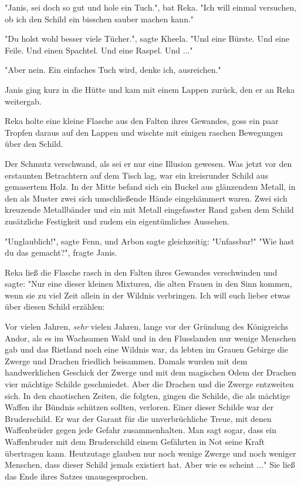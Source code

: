 \documentclass[10pt, a4paper, oneside]{book}
\begin{document}
\begin{multicols}{2}
"Janis, sei doch so gut und hole ein Tuch.", bat Reka. "Ich will einmal versuchen, ob ich den Schild ein bisschen sauber machen kann." 

"Du holst wohl besser viele Tücher.", sagte Kheela. "Und eine Bürste. Und eine Feile. Und einen Spachtel. Und eine Raspel. Und ..." 

"Aber nein. Ein einfaches Tuch wird, denke ich, ausreichen." 

Janis ging kurz in die Hütte und kam mit einem Lappen zurück, den er an Reka weitergab. 

Reka holte eine kleine Flasche aus den Falten ihres Gewandes, goss ein paar Tropfen daraus auf den Lappen und wischte mit einigen raschen Bewegungen über den Schild. 

Der Schmutz verschwand, als sei er nur eine Illusion gewesen. Was jetzt vor den erstaunten Betrachtern auf dem Tisch lag, war ein kreisrunder Schild aus gemasertem Holz. In der Mitte befand sich ein Buckel aus glänzendem Metall, in den als Muster zwei sich umschließende Hände eingehämmert waren. Zwei sich kreuzende Metallbänder und ein mit Metall eingefasster Rand gaben dem Schild zusätzliche Festigkeit und zudem ein eigentümliches Aussehen. 

"Unglaublich!", sagte Fenn, und Arbon sagte gleichzeitig: "Unfassbar!" "Wie hast du das gemacht?", fragte Janis. 

Reka ließ die Flasche rasch in den Falten ihres Gewandes verschwinden und sagte: "Nur eine dieser kleinen Mixturen, die alten Frauen in den Sinn kommen, wenn sie zu viel Zeit allein in der Wildnis verbringen. Ich will euch lieber etwas über diesen Schild erzählen: 

Vor vielen Jahren, \textit{sehr} vielen Jahren, lange vor der Gründung des Königreichs Andor, als es im Wachsamen Wald und in den Flusslanden nur wenige Menschen gab und das Rietland noch eine Wildnis war, da lebten im Grauen Gebirge die Zwerge und Drachen friedlich beisammen. Damals wurden mit dem handwerklichen Geschick der Zwerge und mit dem magischen Odem der Drachen vier mächtige Schilde geschmiedet. Aber die Drachen und die Zwerge entzweiten sich. In den chaotischen Zeiten, die folgten, gingen die Schilde, die als mächtige Waffen ihr Bündnis schützen sollten, verloren. Einer dieser Schilde war der Bruderschild. Er war der Garant für die unverbrüchliche Treue, mit denen Waffenbrüder gegen jede Gefahr zusammenhalten. Man sagt sogar, dass ein Waffenbruder mit dem Bruderschild einem Gefährten in Not seine Kraft übertragen kann. Heutzutage glauben nur noch wenige Zwerge und noch weniger Menschen, dass dieser Schild jemals existiert hat. Aber wie es scheint ..." Sie ließ das Ende ihres Satzes unausgesprochen. 


\end{multicols}
\end{document}
